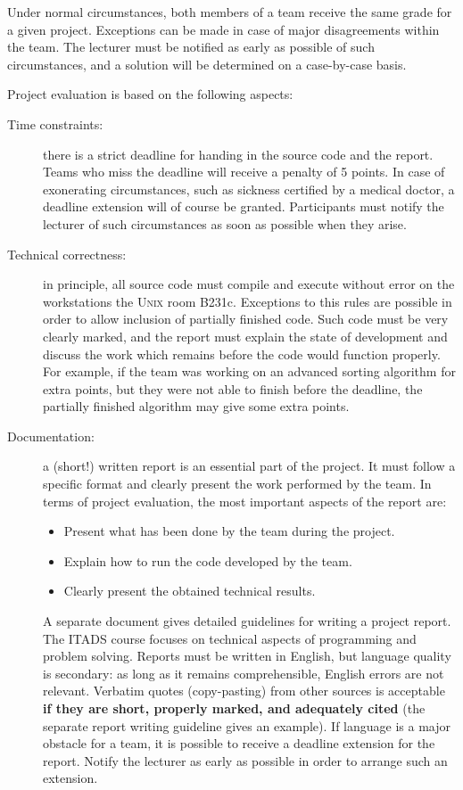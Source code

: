 \documentclass[a4paper,10pt]{article}
\begin{document}
Under normal circumstances, both members of a team receive the same grade for a given project.
Exceptions can be made in case of major disagreements within the team.
The lecturer must be notified as early as possible of such circumstances, and a solution will be determined on a case-by-case basis.

Project evaluation is based on the following aspects:

\begin{description}

\item[Time constraints:]
  there is a strict deadline for handing in the source code and the report.
  Teams who miss the deadline will receive a penalty of 5 points.
  In case of exonerating circumstances, such as sickness certified by a medical doctor, a deadline extension will of course be granted.
  Participants must notify the lecturer of such circumstances as soon as possible when they arise.
  
\item[Technical correctness:]
  in principle, all source code must compile and execute without error on the workstations the \textsc{Unix} room B231c.
  Exceptions to this rules are possible in order to allow inclusion of partially finished code.
  Such code must be very clearly marked, and the report must explain the state of development and discuss the work which remains before the code would function properly.
  For example, if the team was working on an advanced sorting algorithm for extra points, but they were not able to finish before the deadline, the partially finished algorithm may give some extra points.
  
\item[Documentation:]
  a (short!) written report is an essential part of the project.
  It must follow a specific format and clearly present the work performed by the team.
  In terms of project evaluation, the most important aspects of the report are:
  \begin{itemize}
  \item Present what has been done by the team during the project.
  \item Explain how to run the code developed by the team.
  \item Clearly present the obtained technical results.
  \end{itemize}
  A separate document gives detailed guidelines for writing a project report.
  The ITADS course focuses on technical aspects of programming and problem solving.
  Reports must be written in English, but language quality is secondary: as long as it remains comprehensible, English errors are not relevant.
  Verbatim quotes (copy-pasting) from other sources is acceptable \textbf{if they are short, properly marked, and adequately cited} (the separate report writing guideline gives an example).
  If language is a major obstacle for a team, it is possible to receive a deadline extension for the report.
  Notify the lecturer as early as possible in order to arrange such an extension.
  

\end{description}
\end{document}
